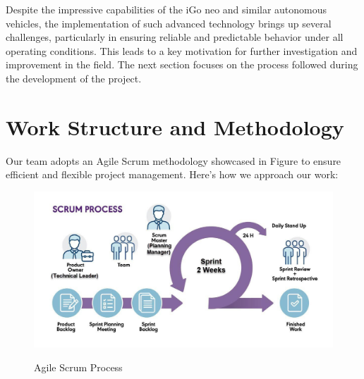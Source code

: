 Despite the impressive capabilities of the iGo neo and similar autonomous vehicles, the implementation 
of such advanced technology brings up several challenges, particularly in ensuring reliable and predictable 
behavior under all operating conditions. This leads to a key motivation for further investigation and improvement 
in the field.
The next section focuses on the process followed during the development of the project. 



\section{Work Structure and Methodology}

Our team adopts an Agile Scrum methodology showcased in Figure  to ensure 
efficient and flexible project management. Here’s how we approach our work:

\begin{figure}[H]
    \begin{center}
       \includegraphics[width=6in]{images/Chap0/blog-scrum-process-opt.jpg}\\
       \caption{Agile Scrum Process \cite{R6}}
       \label{Agile Scrum Process}
       \end{center}
\end{figure}

